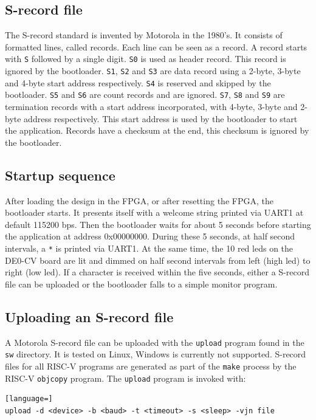 \documentclass[12pt]{article}
\begin{document}
\subsection{S-record file}
The S-record standard is invented by Motorola in the 1980's. It consists of formatted lines, called records. Each line can be seen as a record. A record starts with \lstinline|S| followed by a single digit. \lstinline|S0| is used as header record. This record is ignored by the bootloader. \lstinline|S1|,  \lstinline|S2| and \lstinline|S3| are data record using a 2-byte, 3-byte and 4-byte start address respectively. \lstinline|S4| is reserved and skipped by the bootloader. \lstinline|S5| and \lstinline|S6| are count records and are ignored. \lstinline|S7|, \lstinline|S8| and \lstinline|S9| are termination records with a start address incorporated, with 4-byte, 3-byte and 2-byte address respectively. This start address is used by the bootloader to start the application. Records have a checksum at the end, this checksum is ignored by the bootloader.

\subsection{Startup sequence}
After loading the design in the FPGA, or after resetting the FPGA, the bootloader starts. It presents itself with a welcome string printed via UART1 at default 115200 bps. Then the bootloader waits for about 5 seconds before starting the application at address 0x00000000. During these 5 seconds, at half second intervals, a \lstinline|*| is printed via UART1. At the same time, the 10 red leds on the DE0-CV board are lit and dimmed on half second intervals from left (high led) to right (low led). If a character is received within the five seconds, either a S-record file can be uploaded or the bootloader falls to a simple monitor program.

\subsection{Uploading an S-record file}
A Motorola S-record file can be uploaded with the \lstinline|upload| program found in the \lstinline|sw| directory. It is tested on Linux, Windows is currently not supported. S-record files for all RISC-V programs are generated as part of the \lstinline|make| process by the RISC-V \lstinline|objcopy| program. The \lstinline|upload| program is invoked with:

\begin{lstlisting}[language=]
upload -d <device> -b <baud> -t <timeout> -s <sleep> -vjn file
\end{lstlisting}
\end{document}
